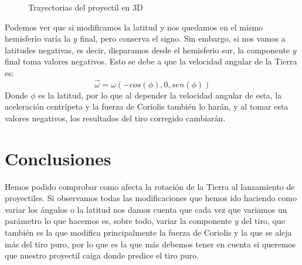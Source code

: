 \documentclass{article}
\begin{document}
\begin{figure}[H]
 \centering
 \caption{Trayectorias del proyectil en 3D}
\label{fig1}
\end{figure}
Podemos ver que si modificamos la latitud y nos quedamos en el mismo hemisferio varía la $y$ final, pero conserva el signo. Sin embargo, si nos vamos a latitudes negativas, es decir, disparamos desde el hemisferio sur, la componente $y$ final toma valores negativos. Esto se debe a que la velocidad angular de la Tierra es:
\begin{equation}
\vec{\omega}=\omega(-cos(\phi),0,sen(\phi))
\end{equation}
Donde $\phi$ es la latitud, por lo que al depender la velocidad angular de esta, la aceleración  centrípeta y la fuerza de Coriolis también lo harán,  y al tomar esta valores negativos, los resultados del tiro corregido cambiarán.
\section{Conclusiones}
Hemos podido comprobar como afecta la rotación de la Tierra al lanzamiento de proyectiles. Si observamos todas las modificaciones que hemos ido haciendo como variar los ángulos o la latitud nos damos cuenta que cada vez que variamos un parámetro lo que hacemos es, sobre todo, variar la componente $y$ del tiro, que también es la que modifica principalmente la fuerza de Coriolis y la que se aleja más del tiro puro, por lo que es la que más debemos tener en cuenta si queremos que nuestro proyectil caiga donde predice el tiro puro.
\end{document}
